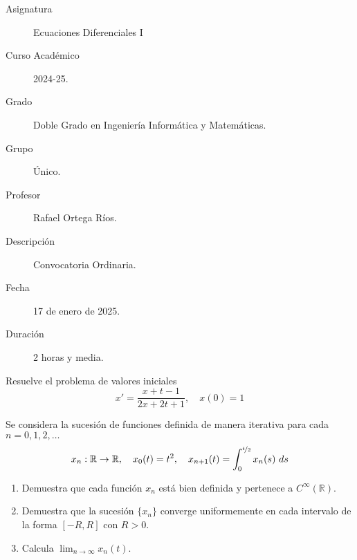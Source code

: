 \documentclass[12pt]{article}
\begin{document}

    
    

    \begin{description}
        \item[Asignatura] Ecuaciones Diferenciales I
        \item[Curso Académico] 2024-25.
        \item[Grado] Doble Grado en Ingeniería Informática y Matemáticas.
        \item[Grupo] Único.
        \item[Profesor] Rafael Ortega Ríos.
        \item[Descripción] Convocatoria Ordinaria.
        \item[Fecha] 17 de enero de 2025.
        \item[Duración] 2 horas y media.    
    \end{description}
    \newpage

    \begin{ejercicio}
        Resuelve el problema de valores iniciales
        \begin{equation*}
            x' = \dfrac{x+t-1}{2x+2t+1}, \quad x(0) = 1
        \end{equation*}
    \end{ejercicio}

    \begin{ejercicio}
        Se considera la sucesión de funciones definida de manera iterativa para cada $n=0,1,2,\ldots$
        \begin{equation*}
            x_n:\mathbb{R}\rightarrow\mathbb{R}, \quad x_0(t)=t^2,\quad x_{n+1}(t) = \int_{0}^{\nicefrac{t}{2}} x_n(s)~ds 
        \end{equation*}
        \begin{enumerate}[label=\alph*)]
            \item Demuestra que cada función $x_n$ está bien definida y pertenece a $C^\infty(\mathbb{R})$.
            \item Demuestra que la sucesión $\{x_n\}$ converge uniformemente en cada intervalo de la forma $[-R,R]$ con $R>0$.
            \item Calcula $\lim_{n\to\infty}x_n(t)$.
        \end{enumerate}
    \end{ejercicio}
\end{document}
